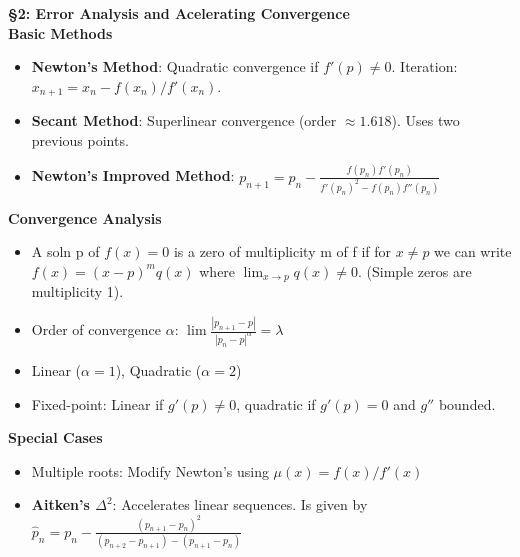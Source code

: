 \documentclass{article}
\begin{document}
\begin{minipage}[t]{0.49\textwidth}

\textbf{\S 2: Error Analysis and Acelerating Convergence}\\

\textbf{Basic Methods}
\begin{itemize}
    \item \textbf{Newton's Method}: Quadratic convergence if $f'(p)\neq0$. Iteration: \\$x_{n+1}=x_n-f(x_n)/f'(x_n)$.
    \item \textbf{Secant Method}: Superlinear convergence (order $\approx1.618$). Uses two previous points.
    \item \textbf{Newton's Improved Method}: $p_{n+1}=p_n-\frac{f(p_n)f'(p_n)}{f'(p_n)^2-f(p_n)f''(p_n)}$
\end{itemize}

\textbf{Convergence Analysis}
\begin{itemize}
  \item A soln p of $f(x)=0$ is a zero of multiplicity m of f if for $x\ne p$ we can write $f(x)=(x-p)^m q(x)$ where $\lim_{x\rightarrow p}{q(x)}\ne 0$. (Simple zeros are multiplicity 1). 
    \item Order of convergence $\alpha$: $\lim \frac{|p_{n+1}-p|}{|p_n-p|^\alpha}=\lambda$
    \item Linear ($\alpha=1$), Quadratic ($\alpha=2$)
    \item Fixed-point: Linear if $g'(p)\neq0$, quadratic if $g'(p)=0$ and $g''$ bounded.
\end{itemize}

\textbf{Special Cases}
\begin{itemize}
    \item Multiple roots: Modify Newton's using $\mu(x)=f(x)/f'(x)$
    \item \textbf{Aitken's $\Delta^2$}: Accelerates linear sequences. Is given by\\$\hat{p}_n = p_n - \frac{(p_{n+1}-p_n)^2}{(p_{n+2}-p_{n+1})-(p_{n+1}-p_n)}$
\end{itemize}


\end{minipage}
\end{document}
